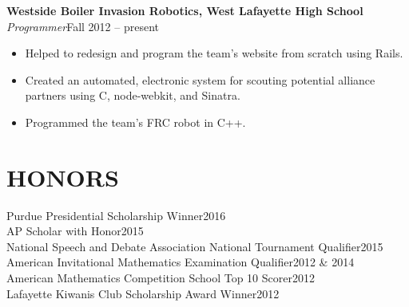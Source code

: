 \documentclass[line,margin]{res}
\begin{document}
\begin{resume}
  {\bf\rmfamily  Westside Boiler Invasion Robotics, West Lafayette High School}\\
  \emph{Programmer}\hfill Fall 2012 -- present
  \begin{itemize}  \itemsep -2pt %
  \item Helped to redesign and program the team's website from scratch using Rails.
  \item Created an automated, electronic system for scouting potential alliance partners using C, node-webkit, and Sinatra.
  \item Programmed the team's FRC robot in C++.
  \end{itemize}





  \section{HONORS}
  Purdue Presidential Scholarship Winner\hfill 2016\\
  AP Scholar with Honor\hfill 2015\\
  National Speech and Debate Association National Tournament Qualifier\hfill 2015\\
  American Invitational Mathematics Examination Qualifier\hfill 2012 \& 2014\\
  American Mathematics Competition School Top 10 Scorer\hfill 2012\\
  Lafayette Kiwanis Club Scholarship Award Winner\hfill 2012



\end{resume}
\end{document}
